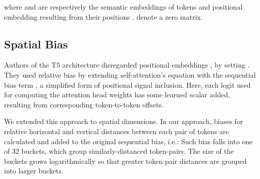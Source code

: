 \documentclass[runningheads]{llncs}
\begin{document}
where  and  are respectively the semantic embeddings of tokens and positional embedding resulting from their positions \cite{transformer}.  denote a zero matrix.




\subsection{Spatial Bias}\label{layout_emb}






Authors of the T5 architecture disregarded positional embeddings \cite{2020t5}, by setting . They used relative bias by extending self-attention's equation with the sequential bias term , a simplified form of positional signal inclusion. Here, each logit used for computing the attention head weights has some learned scalar added, resulting from corresponding token-to-token offsets.

We extended this approach to spatial dimensions. In our approach, biases for relative horizontal and vertical distances between each pair of tokens are calculated and added to the original sequential bias, i.e.:  Such bias falls into one of 32 buckets, which group similarly-distanced token-pairs.
The size of the buckets grows logarithmically so that greater token pair distances are grouped into larger buckets.

\end{document}
